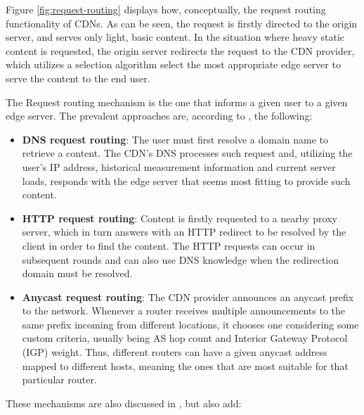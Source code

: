     Figure \ref{fig:request-routing} displays how, conceptually, the request routing functionality of CDNs.
    As can be seen, the request is firstly directed to the origin server, and serves only light, basic content.
    In the situation where heavy static content is requested, the origin server redirects the request to the CDN provider, which utilizes a selection algorithm select the most appropriate edge server to serve the content to the end user.

    The Request routing mechanism is the one that informs a given user to a given edge server.
    The prevalent approaches are, according to \cite{wichtlhuber2017}, the following:

\begin{itemize}
    \item \textbf{DNS request routing}: The user must first resolve a domain name to retrieve a content. The CDN's DNS processes such request and, utilizing the user's IP address, historical measurement information and current server loads, responds with the edge server that seems most fitting to provide such content.
    \item \textbf{HTTP request routing}: Content is firstly requested to a nearby proxy server, which in turn answers with an HTTP redirect to be resolved by the client in order to find the content.
        The HTTP requests can occur in subsequent rounds and can also use DNS knowledge when the redirection domain must be resolved.
    \item \textbf{Anycast request routing}: The CDN provider announces an anycast prefix to the network.
        Whenever a router receives multiple announcements to the same prefix incoming from different locations, it chooses one considering some custom criteria, usually being AS hop count and Interior Gateway Protocol (IGP) weight.
        Thus, different routers can have a given anycast address mapped to different hosts, meaning the ones that are most suitable for that particular router.
\end{itemize}{}

    These mechanisms are also discussed in \cite{cdn-survey}, but also add:

